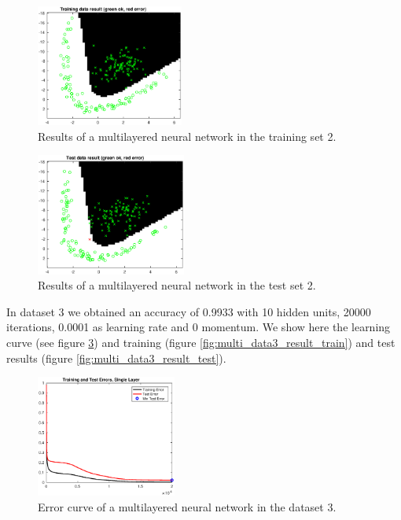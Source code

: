 \documentclass{article}
\begin{document}
\begin{figure}[!htb]
\centering
\includegraphics[height=4cm]{images/multi_data2_result_train}
\caption{Results of a multilayered neural network in the training set 2.}
\label{fig:multi_data2_result_train}
\end{figure}

\begin{figure}[!htb]
\centering
\includegraphics[height=4cm]{images/multi_data2_result_test}
\caption{Results of a multilayered neural network in the test set 2.}
\label{fig:multi_data2_result_test}
\end{figure}


In dataset 3 we obtained an accuracy of 0.9933 with 10 hidden units, 20000 iterations, 0.0001 as learning rate and 0 momentum. We show here the learning curve (see figure \ref{fig:multi_data3_error}) and training (figure \ref{fig:multi_data3_result_train}) and test results (figure \ref{fig:multi_data3_result_test}).

\begin{figure}[!htb]
\centering
\includegraphics[height=4cm]{images/multi_data3_error}
\caption{Error curve of a multilayered neural network in the dataset 3.}
\label{fig:multi_data3_error}
\end{figure}
\end{document}
